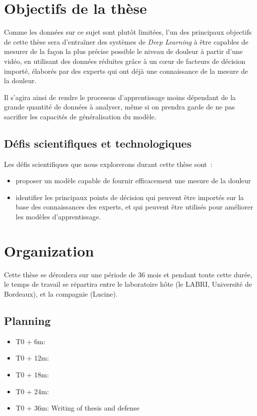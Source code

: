\documentclass[11pt]{article}
\begin{document}
\section{Objectifs de la thèse}
\label{sec:orgf1f9281}

Comme les données sur ce sujet sont plutôt limitées, l’un des principaux
objectifs de cette thèse sera d’entraîner des systèmes de \emph{Deep Learning} à être
capables de mesurer de la façon la plus précise possible le niveau de douleur
à partir d'une vidéo, en utilisant des données réduites grâce à un c\oe{}ur de facteurs de
décision importé, élaborés par des experts qui ont déjà une connaissance de la
mesure de la douleur.  

Il s’agira ainsi de rendre le processus d’apprentissage moins dépendant de la
grande quantité de données à analyser, même si on prendra garde de ne pas
sacrifier les capacités de généralisation du modèle.  


\subsection{Défis scientifiques et technologiques}
\label{sec:org70ad40f}

Les défis scientifiques que nous explorerons durant cette thèse sont~:
\begin{itemize}
\item proposer un modèle capable de fournir efficacement une mesure de la douleur
\item identifier les principaux points de décision qui peuvent être importés sur
la base des connaissances des experts, et qui peuvent être utilisés pour
améliorer les modèles d’apprentissage.
\end{itemize}


\section{Organization}
\label{sec:org1cc9eab}
Cette thèse se déroulera sur une période de 36 mois et pendant toute cette
durée, le temps de travail se répartira entre le laboratoire hôte (le LABRI,
Université de Bordeaux), et la compagnie (Lucine).

\subsection{Planning}
\label{sec:org8a30be3}
\begin{itemize}
\item T0 + 6m:
\item T0 + 12m:
\item T0 + 18m:
\item T0 + 24m:
\item T0 + 36m: Writing of thesis and defense
\end{itemize}





\end{document}
